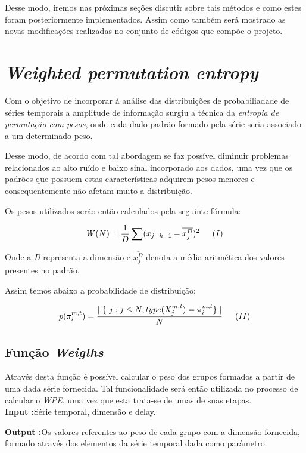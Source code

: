 \documentclass[12pt,letterpaper]{article}
\begin{document}
Desse modo, iremos nas próximas seções discutir sobre tais métodos e como estes foram posteriormente implementados. Assim como também será mostrado as novas modificações realizadas no conjunto de códigos que compõe o projeto.

\section{\textit{Weighted permutation entropy}}

Com o objetivo de incorporar à análise das distribuições de probabiliadade de séries temporais a amplitude de informação surgiu a técnica da \textit{entropia de permutação com pesos}, onde cada dado padrão formado pela série seria associado a um determinado peso.

Desse modo, de acordo com tal abordagem se faz possível diminuir problemas relacionados ao alto ruído e baixo sinal incorporado aos dados, uma vez que os padrões que possuem estas características adquirem pesos menores e consequentemente não afetam muito a distribuição.

Os pesos utilizados serão então calculados pela seguinte fórmula:

$$ W(N) = \frac{1}{D} \sum(x_{j+k-1} - \overline{x_{j}^D})^2 \indent (I)$$

Onde a \textit{D} representa a dimensão e $\overline{x_{j}^D}$ denota a média aritmética dos valores presentes no padrão.

Assim temos abaixo a probabilidade de distribuição:

$$ p(\pi_{i}^{m,t})=\frac{ || \{\ j: j \leq N, type (X_{j}^{m,t}) = \pi_{i}^{m,t} \} || }{N} \indent (II)$$

\subsection{Função \textit{Weigths}}

Através desta função é possível calcular o peso dos grupos formados a partir de uma dada série fornecida. Tal funcionalidade será então utilizada no processo de calcular o \textit{WPE}, uma vez que esta trata-se de umas de suas etapas.\\

\textbf{Input :}Série temporal, dimensão e delay.

\textbf{Output :}Os valores referentes ao peso de cada grupo com a dimensão fornecida, formado através dos elementos da série temporal dada como parâmetro.\\
\end{document}
